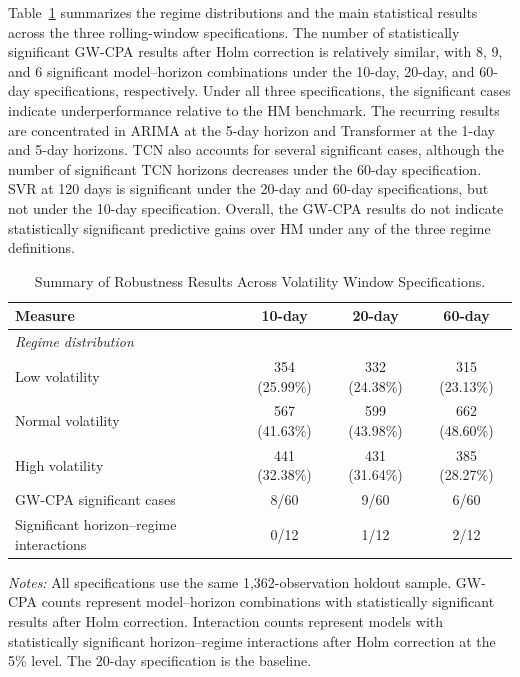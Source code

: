 \documentclass[runningheads,orivec]{llncs}
\begin{document}
Table~\ref{tab:volatility_window_robustness} summarizes the regime distributions and the main statistical results across the three rolling-window specifications. The number of statistically significant GW-CPA results after Holm correction is relatively similar, with 8, 9, and 6 significant model--horizon combinations under the 10-day, 20-day, and 60-day specifications, respectively. Under all three specifications, the significant cases indicate underperformance relative to the HM benchmark. The recurring results are concentrated in ARIMA at the 5-day horizon and Transformer at the 1-day and 5-day horizons. TCN also accounts for several significant cases, although the number of significant TCN horizons decreases under the 60-day specification. SVR at 120 days is significant under the 20-day and 60-day specifications, but not under the 10-day specification. Overall, the GW-CPA results do not indicate statistically significant predictive gains over HM under any of the three regime definitions.

\begin{table}[htbp]
\centering
\caption{Summary of Robustness Results Across Volatility Window Specifications.}\label{tab:volatility_window_robustness}
\setlength{\tabcolsep}{6pt}
\begin{tabular}{lccc}
\hline
\textbf{Measure} & \textbf{10-day} & \textbf{20-day} & \textbf{60-day} \\
\hline
\multicolumn{4}{l}{\textit{Regime distribution}} \\
Low volatility & 354 (25.99\%) & 332 (24.38\%) & 315 (23.13\%) \\
Normal volatility & 567 (41.63\%) & 599 (43.98\%) & 662 (48.60\%) \\
High volatility & 441 (32.38\%) & 431 (31.64\%) & 385 (28.27\%) \\
\hline
GW-CPA significant cases & 8/60 & 9/60 & 6/60 \\
Significant horizon--regime interactions & 0/12 & 1/12 & 2/12 \\
\hline
\end{tabular}
\par\vspace{4pt}\parbox{\linewidth}{\scriptsize\textit{Notes:} All specifications use the same 1,362-observation holdout sample. GW-CPA counts represent model--horizon combinations with statistically significant results after Holm correction. Interaction counts represent models with statistically significant horizon--regime interactions after Holm correction at the 5\% level. The 20-day specification is the baseline.}
\end{table}
\end{document}
